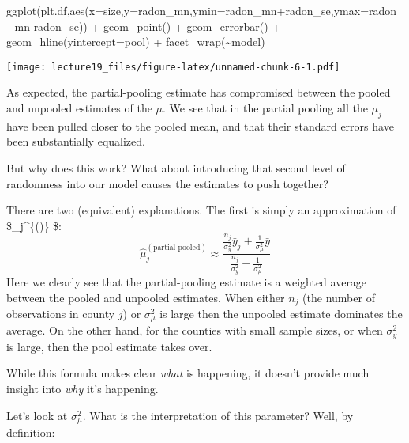 \documentclass[
]{article}
\newenvironment{Shaded}{\begin{snugshade}}{\end{snugshade}}
\newcommand{\AttributeTok}[1]{\textcolor[rgb]{0.77,0.63,0.00}{#1}}
\newcommand{\FunctionTok}[1]{\textcolor[rgb]{0.00,0.00,0.00}{#1}}
\newcommand{\NormalTok}[1]{#1}
\newcommand{\SpecialCharTok}[1]{\textcolor[rgb]{0.00,0.00,0.00}{#1}}
\begin{document}
\begin{Shaded}
\begin{Highlighting}[]
\FunctionTok{ggplot}\NormalTok{(plt.df,}\FunctionTok{aes}\NormalTok{(}\AttributeTok{x=}\NormalTok{size,}\AttributeTok{y=}\NormalTok{radon\_mn,}\AttributeTok{ymin=}\NormalTok{radon\_mn}\SpecialCharTok{+}\NormalTok{radon\_se,}\AttributeTok{ymax=}\NormalTok{radon\_mn}\SpecialCharTok{{-}}\NormalTok{radon\_se)) }\SpecialCharTok{+}
  \FunctionTok{geom\_point}\NormalTok{() }\SpecialCharTok{+}
  \FunctionTok{geom\_errorbar}\NormalTok{() }\SpecialCharTok{+}
  \FunctionTok{geom\_hline}\NormalTok{(}\AttributeTok{yintercept=}\NormalTok{pool) }\SpecialCharTok{+}
  \FunctionTok{facet\_wrap}\NormalTok{(}\SpecialCharTok{\textasciitilde{}}\NormalTok{model)}
\end{Highlighting}
\end{Shaded}

\texttt{[image: lecture19\_files/figure-latex/unnamed-chunk-6-1.pdf]}

As expected, the partial-pooling estimate has compromised between the
pooled and unpooled estimates of the \(\mu\). We see that in the partial
pooling all the \(\mu_j\) have been pulled closer to the pooled mean,
and that their standard errors have been substantially equalized.

But why does this work? What about introducing that second level of
randomness into our model causes the estimates to push together?

There are two (equivalent) explanations. The first is simply an
approximation of \$\hat{\mu}\_j\^{}\{()\} \$: \[
\hat \mu_j^{(\text{partial pooled})} \approx \frac{ \frac{n_j}{\sigma^2_y} \bar y_j + \frac{1}{\sigma^2_{\mu}} \bar y  }{\frac{n_j}{\sigma^2_y} + \frac{1}{\sigma^2_{\mu}}}
\] Here we clearly see that the partial-pooling estimate is a weighted
average between the pooled and unpooled estimates. When either \(n_j\)
(the number of observations in county \(j\)) or \(\sigma^2_{\mu}\) is
large then the unpooled estimate dominates the average. On the other
hand, for the counties with small sample sizes, or when \(\sigma_y^2\)
is large, then the pool estimate takes over.

While this formula makes clear \emph{what} is happening, it doesn't
provide much insight into \emph{why} it's happening.

Let's look at \(\sigma^2_{\mu}\). What is the interpretation of this
parameter? Well, by definition:
\end{document}
